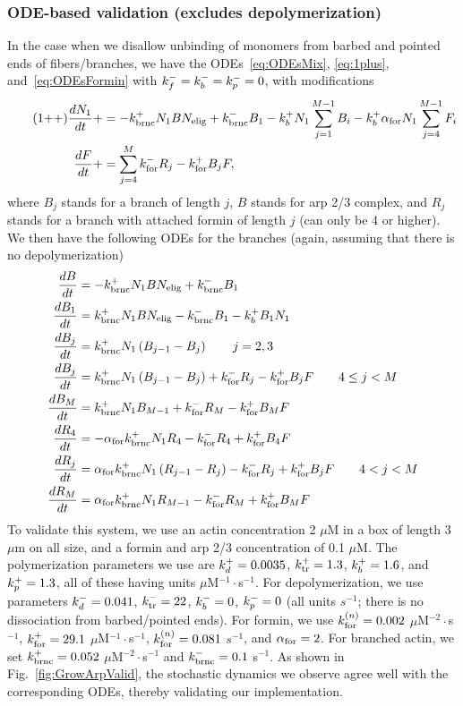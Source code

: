 \documentclass[11pt]{article}
\begin{document}
\begin{appendices}
\subsubsection{ODE-based validation (excludes depolymerization)}
In the case when we disallow unbinding of monomers from barbed and pointed ends of fibers/branches, we have the ODEs\ \eqref{eq:ODEsMix}, \eqref{eq:1plus}, and\ \eqref{eq:ODEsFormin} with $k_f^-=k_b^-=k_p^-=0$, with modifications
\begin{align*}
\label{eq:1plusplus}
\tag{1++}
\frac{dN_1}{dt} +&=-k_\text{brnc}^+ N_1 B N_\text{elig}+k_\text{brnc}^- B_1 -k_b^+ N_1 \sum_{j=1}^{M-1}  B_i -k_b^+ \alpha_\text{for} N_1 \sum_{j=4}^{M-1} F_i \\
\frac{d F}{dt} +&= \sum_{j=4}^{M} k_\text{for}^- R_j - k_\text{for}^+ B_j F,
\end{align*}
where $B_j$ stands for a branch of length $j$, $B$ stands for arp 2/3 complex, and $R_j$ stands for a branch with attached formin of length $j$ (can only be 4 or higher). We then have the following ODEs for the branches (again, assuming that there is no depolymerization)
\begin{subequations}
\label{eq:ODEsBrOnly}
\begin{align}
\frac{dB}{dt} &= -k_\text{brnc}^+ N_1 B N_\text{elig}+k_\text{brnc}^- B_1 \\
\frac{d B_1}{dt } &= k_\text{brnc}^+ N_1 B N_\text{elig}- k_\text{brnc}^- B_1 -k_b^+ B_1 N_1 \\
\frac{d B_j}{dt } & = k_\text{brnc}^+ N_1 \left(B_{j-1}-B_j\right) \qquad j=2,3\\
\frac{d B_j}{dt} & = k_\text{brnc}^+ N_1 \left(B_{j-1}-B_j\right)+k_\text{for}^- R_j - k_\text{for}^+ B_j F \qquad 4 \leq j < M\\
\frac{d B_M}{dt} & = k_\text{brnc}^+ N_1 B_{M-1}+k_\text{for}^- R_M - k_\text{for}^+ B_M F\\
\frac{d R_4}{dt} & = -\alpha_\text{for} k_\text{brnc}^+ N_1 R_4 -k_\text{for}^- R_4 + k_\text{for}^+ B_4 F \\
\frac{d R_j}{dt} & = \alpha_\text{for} k_\text{brnc}^+ N_1 \left(R_{j-1}-R_j\right)-k_\text{for}^- R_j + k_\text{for}^+ B_j F \qquad 4 < j < M\\
\frac{d R_M}{dt} & = \alpha_\text{for} k_\text{brnc}^+ N_1 R_{M-1}-k_\text{for}^- R_M + k_\text{for}^+ B_M F
\end{align}
\end{subequations}
To validate this system, we use an actin concentration 2 $\mu$M in a box of length 3 $\mu$m on all size, and a formin and arp 2/3 concentration of 0.1 $\mu$M. The polymerization parameters we use are $k_d^+=0.0035$, $k_\text{tr}^+=1.3$, $k_b^+=1.6$, and $k_p^+=1.3$, all of these having units $\mu$M$^{-1}\cdot$s$^{-1}$. For depolymerization, we use parameters $k_d^- = 0.041$, $k_\text{tr}^- = 22$, $k_b^-=0$, $k_p^-=0$ (all units $s^{-1}$; there is no dissociation from barbed/pointed ends). For formin, we use $k_\text{for}^{(n)} = 0.002$ $\mu$M$^{-2}\cdot$s$^{-1}$, $k_\text{for}^+ = 29.1$ $\mu$M$^{-1}\cdot$s$^{-1}$, $k_\text{for}^{(n)} = 0.081$ $s^{-1}$, and $\alpha_\text{for}=2$. For branched actin, we set $k_\text{brnc}^+=0.052$ $\mu$M$^{-2}\cdot$s$^{-1}$ and $k_\text{brnc}^-=0.1$ s$^{-1}$. As shown in Fig.\ \ref{fig:GrowArpValid}, the stochastic dynamics we observe agree well with the corresponding ODEs, thereby validating our implementation.


\end{appendices}
\end{document}
